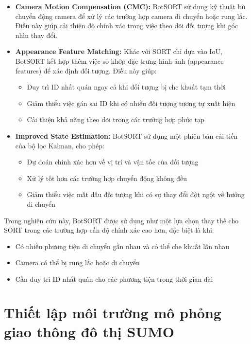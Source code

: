 \begin{itemize}
    \item \textbf{Camera Motion Compensation (CMC):} BotSORT sử dụng kỹ thuật bù chuyển động camera để xử lý các trường hợp camera di chuyển hoặc rung lắc. Điều này giúp cải thiện độ chính xác trong việc theo dõi đối tượng khi góc nhìn thay đổi.

    \item \textbf{Appearance Feature Matching:} Khác với SORT chỉ dựa vào IoU, BotSORT kết hợp thêm việc so khớp đặc trưng hình ảnh (appearance features) để xác định đối tượng. Điều này giúp:
        \begin{itemize}
            \item Duy trì ID nhất quán ngay cả khi đối tượng bị che khuất tạm thời
            \item Giảm thiểu việc gán sai ID khi có nhiều đối tượng tương tự xuất hiện
            \item Cải thiện khả năng theo dõi trong các trường hợp phức tạp
        \end{itemize}

    \item \textbf{Improved State Estimation:} BotSORT sử dụng một phiên bản cải tiến của bộ lọc Kalman, cho phép:
        \begin{itemize}
            \item Dự đoán chính xác hơn về vị trí và vận tốc của đối tượng
            \item Xử lý tốt hơn các trường hợp chuyển động không đều
            \item Giảm thiểu việc mất dấu đối tượng khi có sự thay đổi đột ngột về hướng di chuyển
        \end{itemize}
\end{itemize}

Trong nghiên cứu này, BotSORT được sử dụng như một lựa chọn thay thế cho SORT trong các trường hợp cần độ chính xác cao hơn, đặc biệt là khi:
\begin{itemize}
    \item Có nhiều phương tiện di chuyển gần nhau và có thể che khuất lẫn nhau

    \item Camera có thể bị rung lắc hoặc di chuyển

    \item Cần duy trì ID nhất quán cho các phương tiện trong thời gian dài
\end{itemize}

\section{Thiết lập môi trường mô phỏng giao thông đô thị SUMO}

